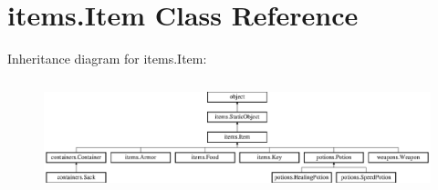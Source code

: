 \hypertarget{classitems_1_1_item}{}\section{items.\+Item Class Reference}
\label{classitems_1_1_item}
Inheritance diagram for items.\+Item\+:\begin{figure}[H]
\begin{center}
\leavevmode
\includegraphics[height=3.286385cm]{classitems_1_1_item}
\end{center}
\end{figure}
